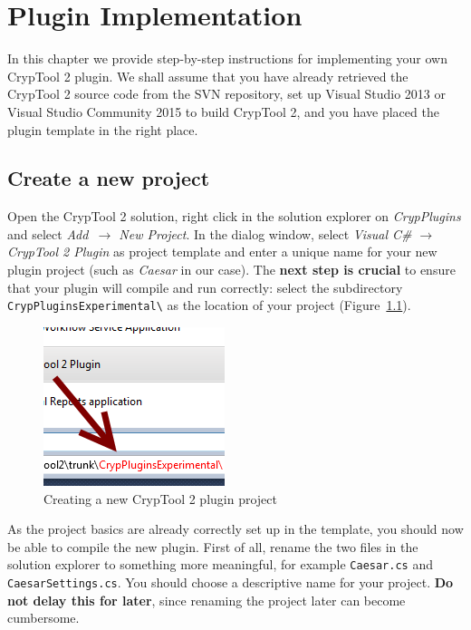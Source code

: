 \chapter{Plugin Implementation}
\label{sec:PluginImplementation}
In this chapter we provide step-by-step instructions for implementing your own CrypTool 2 plugin. We shall assume that you have already retrieved the CrypTool 2 source code from the SVN repository, set up Visual Studio 2013 or Visual Studio Community 2015 to build CrypTool 2, and you have placed the plugin template in the right place.

\section{Create a new project}
\label{sec:CreatingANewProject}

Open the CrypTool 2 solution, right click in the solution explorer on \textit{CrypPlugins} and select \textit{Add~$\rightarrow$ New Project}. In the dialog window, select \textit{Visual C\# $\rightarrow$ CrypTool 2 Plugin} as project template and enter a unique name for your new plugin project (such as \textit{Caesar} in our case). The \textbf{next step is crucial} to ensure that your plugin will compile and run correctly: select the subdirectory \texttt{CrypPluginsExperimental\textbackslash} as the location of your project (Figure~\ref{fig:vs_create_new_project}).

\begin{figure}[h!]
	\centering
		\includegraphics{figures/vs_create_new_project.png}
	\caption{Creating a new CrypTool 2 plugin project}
	\label{fig:vs_create_new_project}
\end{figure}

As the project basics are already correctly set up in the template, you should now be able to compile the new plugin. First of all, rename the two files in the solution explorer to something more meaningful, for example \texttt{Caesar.cs} and \texttt{CaesarSettings.cs}. You should choose a descriptive name for your project. \textbf{Do not delay this for later}, since renaming the project later can become cumbersome.

